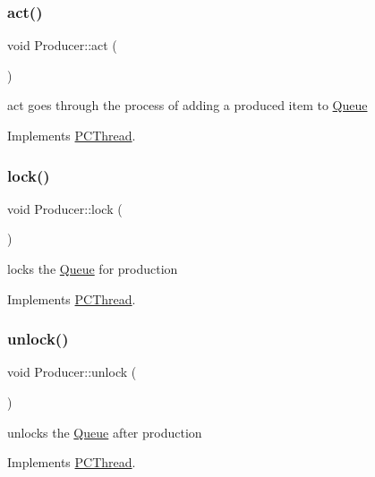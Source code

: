\subsubsection{\texorpdfstring{act()}{act()}}
{\footnotesize\ttfamily void Producer\+::act (\begin{DoxyParamCaption}{ }\end{DoxyParamCaption})\hspace{0.3cm}{\ttfamily [virtual]}}

act goes through the process of adding a produced item to \hyperlink{class_queue}{Queue} 

Implements \hyperlink{class_p_c_thread}{P\+C\+Thread}.

\mbox{\label{class_producer_aba582d5889728f3d4eb6399a5788ab9f}} 
\subsubsection{\texorpdfstring{lock()}{lock()}}
{\footnotesize\ttfamily void Producer\+::lock (\begin{DoxyParamCaption}{ }\end{DoxyParamCaption})\hspace{0.3cm}{\ttfamily [virtual]}}

locks the \hyperlink{class_queue}{Queue} for production 

Implements \hyperlink{class_p_c_thread}{P\+C\+Thread}.

\mbox{\label{class_producer_a9a3ce835478573c67a6c8d928ccbf8f0}} 
\subsubsection{\texorpdfstring{unlock()}{unlock()}}
{\footnotesize\ttfamily void Producer\+::unlock (\begin{DoxyParamCaption}{ }\end{DoxyParamCaption})\hspace{0.3cm}{\ttfamily [virtual]}}

unlocks the \hyperlink{class_queue}{Queue} after production 

Implements \hyperlink{class_p_c_thread}{P\+C\+Thread}.

\mbox{\label{class_producer_ac669b046bc8254d43b7ccc4e3e7a1a8b}} 
